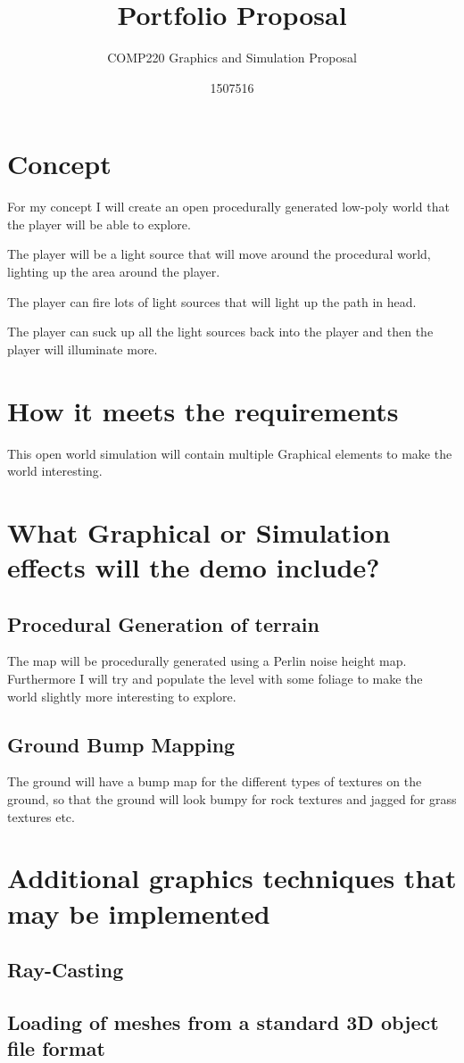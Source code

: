 \documentclass{scrartcl}
\title{Portfolio Proposal}
\subtitle{COMP220 Graphics and Simulation Proposal}
\author{1507516}
\begin{document}
\maketitle

\abstract{}

\section{Concept}
For my concept I will create an open procedurally generated low-poly world that the player will be able to explore.

The player will be a light source that will move around the procedural world, lighting up the area around the player.

The player can fire lots of light sources that will light up the path in head.

The player can suck up all the light sources back into the player and then the player will illuminate more.

\section{How it meets the requirements}

This open world simulation will contain multiple Graphical elements to make the world interesting.

\section{What Graphical or Simulation effects will the demo include?}

\subsection{Procedural Generation of terrain}

The map will be procedurally generated using a Perlin noise height map. Furthermore I will try and populate the level with some foliage to make the world slightly more interesting to explore.

\subsection{Ground Bump Mapping}

The ground will have a bump map for the different types of textures on the ground, so that the ground will look bumpy for rock textures and jagged for grass textures etc.

\section{Additional graphics techniques that may be implemented}

\subsection{Ray-Casting}
  
\subsection{Loading of meshes from a standard 3D object file format}
\end{document}
